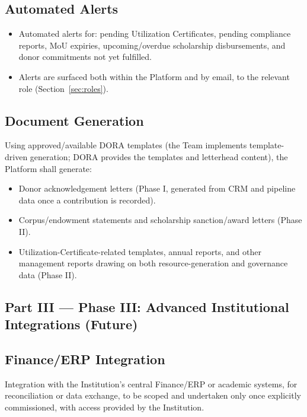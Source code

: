 \documentclass[11pt]{article}
\begin{document}
\subsection{Automated Alerts}
\begin{itemize}[leftmargin=1.4em, itemsep=3pt]
\item Automated alerts for: pending Utilization Certificates, pending compliance reports, MoU expiries, upcoming/overdue scholarship disbursements, and donor commitments not yet fulfilled.
\item Alerts are surfaced both within the Platform and by email, to the relevant role (Section~\ref{sec:roles}).
\end{itemize}

\subsection{Document Generation}
\label{sec:docgen}
Using approved/available DORA templates (the Team implements template-driven generation; DORA provides the templates and letterhead content), the Platform shall generate:
\begin{itemize}[leftmargin=1.4em, itemsep=3pt]
\item Donor acknowledgement letters (Phase I, generated from CRM and pipeline data once a contribution is recorded).
\item Corpus/endowment statements and scholarship sanction/award letters (Phase II).
\item Utilization-Certificate-related templates, annual reports, and other management reports drawing on both resource-generation and governance data (Phase II).
\end{itemize}

\subsection*{Part III --- Phase III: Advanced Institutional Integrations (Future)}

\subsection{Finance/ERP Integration}
Integration with the Institution's central Finance/ERP or academic systems, for reconciliation or data exchange, to be scoped and undertaken only once explicitly commissioned, with access provided by the Institution.
\end{document}
